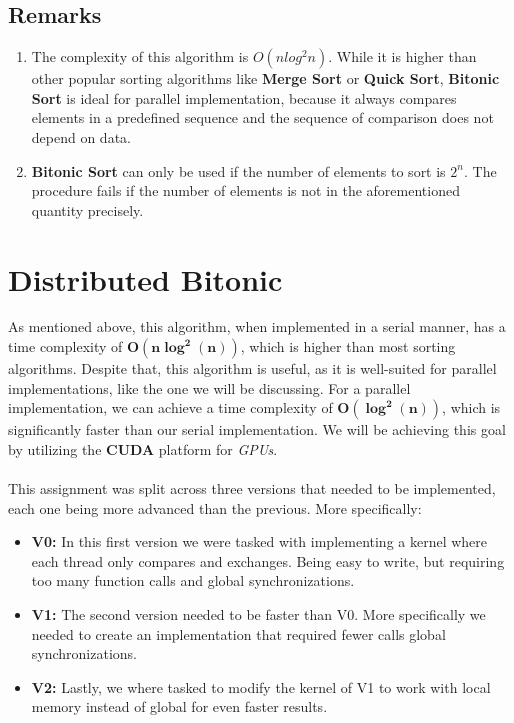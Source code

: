 \documentclass[12pt]{report}
\begin{document}
\section{Remarks}
    \begin{enumerate}
        \item The complexity of this algorithm is $O(nlog^2n)$. While it is higher than other popular sorting algorithms like \textbf{Merge Sort} or \textbf{Quick Sort},  \textbf{Bitonic Sort} is ideal for parallel implementation, because it always compares elements in a predefined sequence and the sequence of comparison does not depend on data. 
        \item \textbf{Bitonic Sort} can only be used if the number of elements to sort is $2^n$. The procedure fails if the number of elements is not in the aforementioned quantity precisely.
    \end{enumerate}
        
\chapter{Distributed Bitonic}
As mentioned above, this algorithm, when implemented in a serial manner, has a time complexity of \(\boldsymbol{O(n\log^2(n))}\), which is higher than most sorting algorithms. Despite that, this algorithm is useful, as it is well-suited for parallel implementations, like the one we will be discussing. For a parallel implementation, we can achieve a time complexity of \(\boldsymbol{O(\log^2(n))}\), which is significantly faster than our serial implementation. We will be achieving this goal by utilizing the \textbf{CUDA} platform for \textit{GPUs}.\\ \\
This assignment was split across three versions that needed to be implemented, each one being more advanced than the previous. More specifically:
\begin{itemize}
    \item \textbf{V0: }In this first version we were tasked with implementing a kernel where each thread only compares and exchanges. Being easy to write, but requiring too many function calls and global synchronizations.
    \item \textbf{V1: }The second version needed to be faster than V0. More specifically we needed to create an implementation that required fewer calls global synchronizations.
    \item \textbf{V2: }Lastly, we where tasked to modify the kernel of V1 to work with local memory instead of global for even faster results.
\end{itemize}
\end{document}
